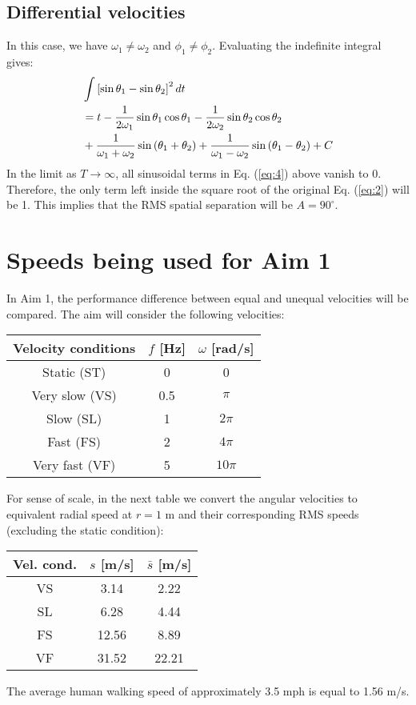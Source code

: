 \documentclass[12pt]{article}
\begin{document}
\subsection{Differential velocities}
In this case, we have $\omega_1 \neq \omega_2$ and $\phi_1 \neq \phi_2$. Evaluating the indefinite integral gives:
\begin{align}\label{eq:4}
  & \int \left[\sin \theta_1 - \sin \theta_2\right]^2 dt \notag\\
  & = t - \frac{1}{2\omega_1}\sin\theta_1\cos\theta_1 - \frac{1}{2\omega_2}\sin\theta_2\cos\theta_2 \notag\\
  & + \frac{1}{\omega_1 + \omega_2}\sin{\left(\theta_1 + \theta_2\right)} + \frac{1}{\omega_1 - \omega_2}\sin{\left(\theta_1 - \theta_2\right)} + C
\end{align}
In the limit as $T \to \infty$, all sinusoidal terms in Eq. (\ref{eq:4}) above vanish to 0. Therefore, the only term left inside the square root of the original Eq. (\ref{eq:2}) will be 1. This implies that the RMS spatial separation will be $A = 90^{\circ}$.


\section{Speeds being used for Aim 1}
In Aim 1, the performance difference between equal and unequal velocities will be compared. The aim will consider the following velocities:

\begin{table}[h!]
\centering
\begin{tabular}{ c | c | c }
  Velocity conditions & $f$ [Hz] & $\omega$ [rad/s] \\\hline
  Static (ST)    & 0   & 0\\
  Very slow (VS) & 0.5 & $\pi$\\
  Slow (SL)      & 1   & $2\pi$\\
  Fast (FS)      & 2   & $4\pi$\\
  Very fast (VF) & 5   & $10\pi$
\end{tabular}
\end{table}
For sense of scale, in the next table we convert the angular velocities to equivalent radial speed at $r = 1$ m and their corresponding RMS speeds (excluding the static condition):

\begin{table}[h!]
\centering
\begin{tabular}{ c | c | c }
  Vel. cond. & $s$ [m/s] & $\bar{s}$ [m/s] \\\hline
  VS &  3.14 & 2.22\\
  SL &  6.28 & 4.44\\
  FS & 12.56 & 8.89\\
  VF & 31.52 & 22.21
\end{tabular}
\end{table}
The average human walking speed of approximately 3.5 mph is equal to 1.56 m/s.
\end{document}
